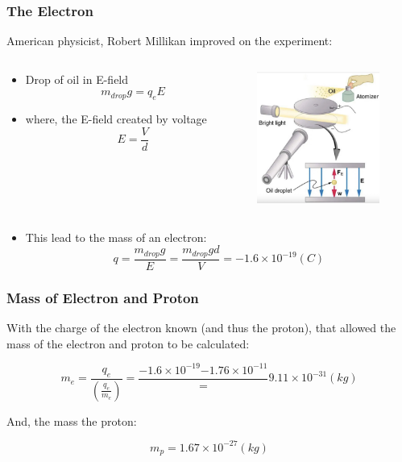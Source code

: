 \documentclass{beamer}
\begin{document}
\begin{frame}\frametitle{The Electron}
American physicist, Robert Millikan improved on the experiment:
\begin{columns}
\begin{column}{7cm}


\begin{itemize}
\item Drop of oil in E-field
\[ m_{drop} g = q_e E\] 
\item where, the E-field created by voltage
\[ E = \frac{V}{d} \]
\end{itemize}
\end{column}
\begin{column}{4.5cm}
\begin{center}
\includegraphics[width=4cm]{fig/millkan.jpg}

\end{center}
\end{column}
\end{columns}
\begin{itemize}
\item This lead to the mass of an electron:
\[ q = \frac{m_{drop} g}{E} = \frac{m_{drop} gd}{V} = -1.6 \times 10^{-19} (C)\]
\end{itemize}
\end{frame}

\begin{frame}\frametitle{Mass of Electron and Proton}
With the charge of the electron known (and thus the proton), that allowed the mass of the electron and proton to be calculated:

\[ m_e = \frac{q_e}{(\frac{q_e}{m_e})} = \frac{-1.6 \times 10^{-19}{-1.76 \times 10^{-11}}}  = 9.11 \times 10^{-31} (kg) \]

\vspace{1cm}

And, the mass the proton:

\[ m_p = 1.67 \times 10^{-27} (kg) \]


\end{frame}
\end{document}

